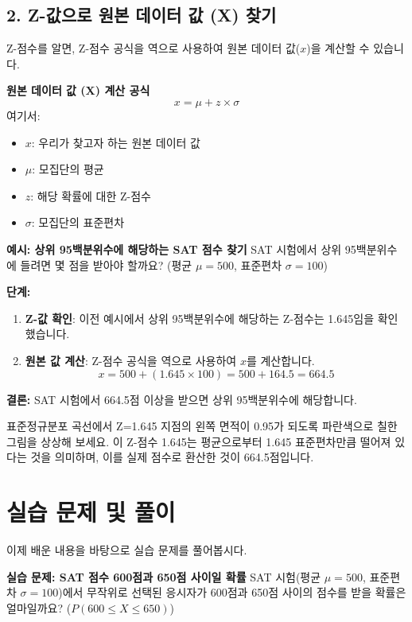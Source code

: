 \documentclass[11pt,a4paper]{book}
\providecommand{\newsection}{\section}
\theoremstyle{definition}
\begin{document}
\subsection{2. Z-값으로 원본 데이터 값 (X) 찾기}
Z-점수를 알면, Z-점수 공식을 역으로 사용하여 원본 데이터 값($x$)을 계산할 수 있습니다.

\begin{definitionbox}
\textbf{원본 데이터 값 (X) 계산 공식}
\[ x = \mu + z \times \sigma \]
여기서:
\begin{itemize}
    \item $x$: 우리가 찾고자 하는 원본 데이터 값
    \item $\mu$: 모집단의 평균
    \item $z$: 해당 확률에 대한 Z-점수
    \item $\sigma$: 모집단의 표준편차
\end{itemize}
\end{definitionbox}

\begin{examplebox}
\textbf{예시: 상위 95백분위수에 해당하는 SAT 점수 찾기}
SAT 시험에서 상위 95백분위수에 들려면 몇 점을 받아야 할까요? (평균 $\mu=500$, 표준편차 $\sigma=100$)

\textbf{단계:}
\begin{enumerate}
    \item \textbf{Z-값 확인}: 이전 예시에서 상위 95백분위수에 해당하는 Z-점수는 1.645임을 확인했습니다.
    \item \textbf{원본 값 계산}: Z-점수 공식을 역으로 사용하여 $x$를 계산합니다.
    \[ x = 500 + (1.645 \times 100) = 500 + 164.5 = 664.5 \]
\end{enumerate}
\textbf{결론:} SAT 시험에서 664.5점 이상을 받으면 상위 95백분위수에 해당합니다.

\begin{tcolorbox}[title={\textbf{시각적 이해}, colback=lightblue!50!white, colframe=darkblue}]
표준정규분포 곡선에서 Z=1.645 지점의 왼쪽 면적이 0.95가 되도록 파란색으로 칠한 그림을 상상해 보세요. 이 Z-점수 1.645는 평균으로부터 1.645 표준편차만큼 떨어져 있다는 것을 의미하며, 이를 실제 점수로 환산한 것이 664.5점입니다.
\end{tcolorbox}
\end{examplebox}

\newsection*{실습 문제 및 풀이}
이제 배운 내용을 바탕으로 실습 문제를 풀어봅시다.

\begin{examplebox}
\textbf{실습 문제: SAT 점수 600점과 650점 사이일 확률}
SAT 시험(평균 $\mu=500$, 표준편차 $\sigma=100$)에서 무작위로 선택된 응시자가 600점과 650점 사이의 점수를 받을 확률은 얼마일까요? ($P(600 \le X \le 650)$)
\end{examplebox}
\end{document}
